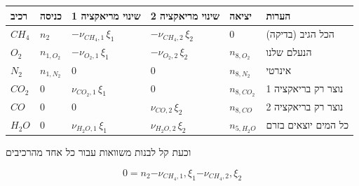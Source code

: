 \documentclass[
  hebrew,
  letterpaper,
  DIV=11,
  numbers=noendperiod]{scrreprt}
\begin{document}
\begin{longtable}[]{@{}
  >{\raggedright\arraybackslash}p{}
  >{\raggedright\arraybackslash}p{}
  >{\raggedright\arraybackslash}p{}
  >{\raggedright\arraybackslash}p{}
  >{\raggedright\arraybackslash}p{}
  >{\raggedright\arraybackslash}p{}@{}}
\toprule\noalign{}
\begin{minipage}[b]{\linewidth}\raggedright
רכיב
\end{minipage} & \begin{minipage}[b]{\linewidth}\raggedright
כניסה
\end{minipage} & \begin{minipage}[b]{\linewidth}\raggedright
שינוי מריאקציה 1
\end{minipage} & \begin{minipage}[b]{\linewidth}\raggedright
שינוי מריאקציה 2
\end{minipage} & \begin{minipage}[b]{\linewidth}\raggedright
יציאה
\end{minipage} & \begin{minipage}[b]{\linewidth}\raggedright
הערות
\end{minipage} \\
\midrule\noalign{}
\endhead
\bottomrule\noalign{}
\endlastfoot
\(CH_4\) & \(n_2\) & \(-\nu_{CH_4,1}\,\xi_1\) & \(-\nu_{CH_4,2}\,\xi_2\)
& \(0\) & הכל הגיב (בדיקה) \\
\(O_2\) & \(n_{1,O_2}\) & \(-\nu_{O_2,1}\,\xi_1\) &
\(-\nu_{O_2,2}\,\xi_2\) & \(n_{8,O_2}\) & הנעלם שלנו \\
\(N_2\) & \(n_{1,N_2}\) & \(0\) & \(0\) & \(n_{8,N_2}\) & אינרטי \\
\(CO_2\) & \(0\) & \(\nu_{CO_2,1}\,\xi_1\) & \(0\) & \(n_{8,CO_2}\) &
נוצר רק בריאקציה 1 \\
\(CO\) & \(0\) & \(0\) & \(\nu_{CO,2}\,\xi_2\) & \(n_{8,CO}\) & נוצר רק
בריאקציה 2 \\
\(H_2O\) & \(0\) & \(\nu_{H_2O,1}\,\xi_1\) & \(\nu_{H_2O,2}\,\xi_2\) &
\(n_{5,H_2O}\) & כל המים יוצאים בזרם \\
\end{longtable}

וכעת קל לבנות משוואות עבור כל אחד מהרכיבים

\[0 = n_{2}{- \nu}_{CH_{4},1},\xi_{1}{- \nu}_{CH_{4},2},\xi_{2}\]
\end{document}
